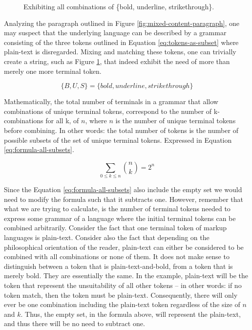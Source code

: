\documentclass{scrreprt}
\begin{document}
\begin{figure}[h]
\centering
{}
\caption{Exhibiting all combinations of \{bold, underline, strikethrough\}.}
\label{fig:mixed-content-paragraph-complex}
\end{figure}


Analyzing the paragraph outlined in Figure \ref{fig:mixed-content-paragraph}, one may suspect that the underlying language can be described by a grammar consisting of the three tokens outlined in Equation \ref{eq:tokens-as-subset} where plain-text is disregarded. Mixing and matching these tokens, one can trivially create a string, such as Figure \ref{fig:mixed-content-paragraph-complex}, that indeed exhibit the need of more than merely one more terminal token.



\begin{equation}
\{B, U, S\} = \{bold, underline, strikethrough\}
\label{eq:tokens-as-subset}
\end{equation}



Mathematically, the total number of terminals in a grammar that allow combinations of unique terminal tokens, correspond to the number of k-combinations for all k, of \(n\), where \(n\) is the number of unique terminal tokens before combining. In other words: the total number of tokens is the number of possible subsets of the set of unique terminal tokens. Expressed in Equation \ref{eq:formula-all-subsets}.

\begin{equation}
\sum_{0\leq{k}\leq{n}} {n \choose k} = 2^n
\label{eq:formula-all-subsets}
\end{equation}

Since the Equation \ref{eq:formula-all-subsets} also include the empty set we would need to modify the formula such that it subtracts one. However, remember that what we are trying to calculate, is the number of terminal tokens needed to express some grammar of a language where the initial terminal tokens can be combined arbitrarily. Consider the fact that one terminal token of markup languages is plain-text. Consider also the fact that depending on the philosophical orientation of the reader, plain-text can either be considered to be combined with all combinations or none of them. It does not make sense to distinguish between a token that is plain-text-and-bold, from a token that is merely bold. They are essentially the same. In the example, plain-text will be the token that represent the unsuitability of all other tokens -- in other words: if no token match, then the token must be plain-text. Consequently, there will only ever be one combination including the plain-text token regardless of the size of \(n\) and \(k\). Thus, the empty set, in the formula above, will represent the plain-text, and thus there will be no need to subtract one.
\end{document}
